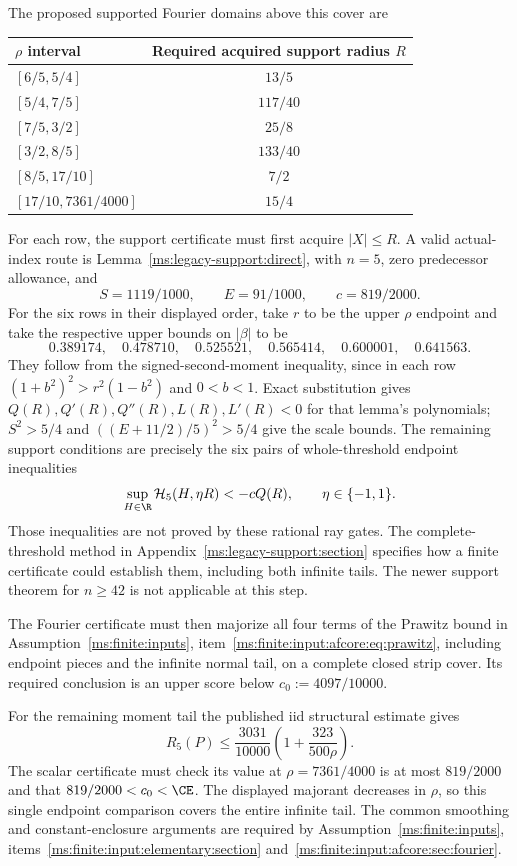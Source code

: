 The proposed supported Fourier domains above this cover are
\begin{center}
\begin{tabular}{@{}lc@{}}\toprule
$\rho$ interval & Required acquired support radius $R$\\\midrule
$[6/5,5/4]$ & $13/5$\\
$[5/4,7/5]$ & $117/40$\\
$[7/5,3/2]$ & $25/8$\\
$[3/2,8/5]$ & $133/40$\\
$[8/5,17/10]$ & $7/2$\\
$[17/10,7361/4000]$ & $15/4$\\\bottomrule
\end{tabular}
\end{center}
For each row, the support certificate must first acquire $|X|\le R$.
A valid actual-index route is Lemma~\ref{ms:legacy-support:direct}, with
$n=5$, zero predecessor allowance, and
\[
 S=1119/1000,\qquad E=91/1000,\qquad c=819/2000.
\]
For the six rows in their displayed order, take $r$ to be the upper
$\rho$ endpoint and take the respective upper bounds on $|\beta|$ to be
\[
 0.389174,\quad 0.478710,\quad 0.525521,\quad 0.565414,\quad
 0.600001,\quad 0.641563.
\]
They follow from the signed-second-moment inequality, since in each row
$(1+b^2)^2>r^2(1-b^2)$ and $0<b<1$. Exact substitution gives
$Q(R),Q'(R),Q''(R),L(R),L'(R)<0$ for that lemma's polynomials;
$S^2>5/4$ and $((E+11/2)/5)^2>5/4$ give the scale bounds.
The remaining support conditions are precisely the six pairs of
whole-threshold endpoint inequalities
\[
 \sup_{H\in\R}\mathcal H_5(H,\eta R)<-cQ(R),\qquad \eta\in\{-1,1\}.
\]
Those inequalities are not proved by these rational ray gates. The
complete-threshold method in Appendix~\ref{ms:legacy-support:section}
specifies how a finite certificate could establish them, including both
infinite tails. The newer support theorem for $n\ge42$ is not applicable
at this step.

The Fourier certificate must then majorize all four terms of
the Prawitz bound in Assumption~\ref{ms:finite:inputs}, item~\ref{ms:finite:input:afcore:eq:prawitz}, including endpoint pieces and the infinite
normal tail, on a complete closed strip cover. Its required conclusion
is an upper score below $c_0:=4097/10000$.

For the remaining moment tail the published iid structural estimate
\cite{Shevtsova2013} gives
\[
 R_5(P)\le\frac{3031}{10000}
             \left(1+\frac{323}{500\rho}\right).
\]
The scalar certificate must check its value at $\rho=7361/4000$ is
at most $819/2000$ and that $819/2000<c_0<\CE$.
The displayed majorant decreases in $\rho$, so this single endpoint
comparison covers the entire infinite tail. The common smoothing and
constant-enclosure arguments are required by Assumption~\ref{ms:finite:inputs},
items~\ref{ms:finite:input:elementary:section} and~\ref{ms:finite:input:afcore:sec:fourier}.

